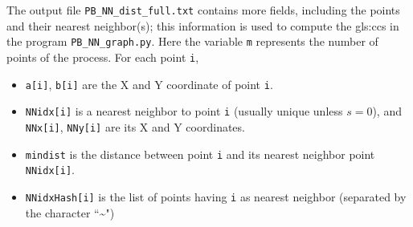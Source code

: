 \documentclass[10pt]{article}
\begin{document}
The output file \texttt{PB\_NN\_dist\_full.txt} contains more fields, including the points and their nearest neighbor(s); this information is used to
compute the \glspl{gls:cc}
in the program \texttt{PB\_NN\_graph.py}. Here the variable \texttt{m} represents the number of points of the process. For each point \texttt{i},
\begin{itemize}
\item \texttt{a[i]}, \texttt{b[i]} are the X and Y coordinate of point \texttt{i}.
\item \texttt{NNidx[i]} is a nearest neighbor to point \texttt{i} (usually unique unless $s=0$), and \texttt{NNx[i]}, \texttt{NNy[i]} are its X and Y coordinates.
\item \texttt{mindist} is the distance between point \texttt{i} and its nearest neighbor point \texttt{NNidx[i]}.
\item \texttt{NNidxHash[i]} is the list of points having \texttt{i} as nearest neighbor (separated by the character ``\textasciitilde")
\end{itemize}
\end{document}
